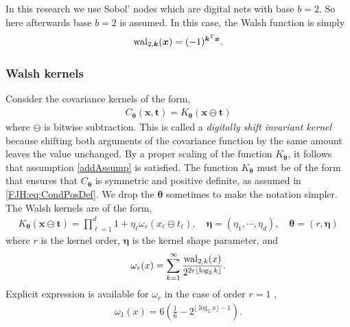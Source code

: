 \documentclass{svjour3}                     %
\let\vec\relax
\newcommand{\bm}[1]{\boldsymbol{#1}}
\newcommand{\veta}{{\bm{\eta}}}
\newcommand{\vtheta}{{\bm{\theta}}}
\newcommand{\vk}{\bm{k}}
\newcommand{\vt}{\bm{t}}
\newcommand{\vx}{\bm{x}}
\newcommand{\JRNote}[1]{{\textcolor{green}{JR: #1}}}
\begin{document}
In this research we use Sobol' nodes which are digital nets with base $b=2$. So here afterwards base $b=2$ is assumed. %
In this case, the Walsh function is simply $$\textup{wal}_{2,\vk} (\vx) = (-1)^{\vec{\vk}^T \vec{\vx}}.$$

\subsubsection{Walsh kernels}
Consider the covariance kernels of the form,
\begin{align}
\label{eqn:digital_shift_in_kernel}
C_{\vtheta}(\vx, \vt) = K_{\vtheta} (\vx \ominus \vt) 
\end{align}
where $\ominus$ is bitwise subtraction.
This is called a \emph{digitally shift invariant kernel} because shifting both arguments of the covariance function by the same amount leaves the value unchanged. By a proper scaling of the function $K_{\vtheta}$, it follows that assumption \eqref{addAssump} is satisfied. The function $K_{\vtheta}$ must be of the form that ensures that $C_{\vtheta}$ is symmetric and positive definite, as assumed in \eqref{FJH:eq:CondPosDef}. We drop the ${\vtheta}$ sometimes to make the notation simpler.
The Walsh kernels are of the form,
\begin{align}
\label{eqn:walsh_kernel}
K_{\vtheta} (\vx \ominus \vt) =  
\prod_{\ell=1}^d  1 + \eta_\ell \omega_{r} (x_\ell \ominus t_\ell), \quad \veta = (\eta_1, \cdots, \eta_d), \quad \vtheta = (r, \veta)
\end{align}
where $r$ is the kernel order, $\veta$ is the kernel shape parameter, and
\begin{align*}
\omega_r(x) = \sum_{k=1}^\infty 
\frac{\textup{wal}_{2,k}(x) }{2^{2r \lfloor \log_2 k \rfloor}}.
\end{align*}
Explicit expression is available for $\omega_{r}$ in the case of order $r=1$ \cite{Nuyens2013}, %
\begin{align}
\label{eqn:omega1}
\omega_1(x) 
= 6\left( \frac 16 - 2^{\lfloor \log_2 x \rfloor -1 }\right).
\end{align}
\end{document}

